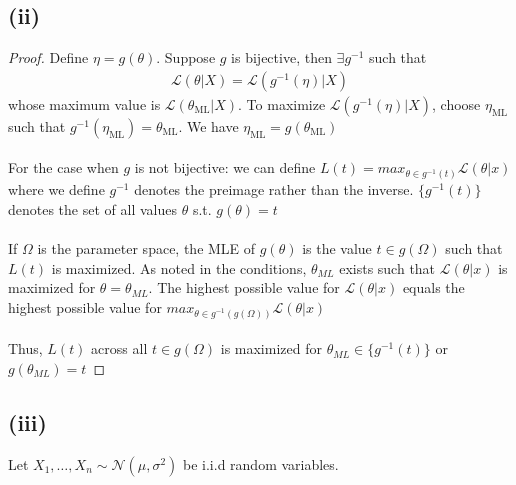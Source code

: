 \documentclass[twoside,11pt]{homework}
\begin{document}
\subsection*{(ii)}
	\begin{proof}
		Define $\eta = g(\theta)$. Suppose $g$ is bijective, then $\exists g^{-1}$ such that 
		\begin{align*}
			\mathcal{L}(\theta|X) = \mathcal{L}( g^{-1}(\eta) |X)
		\end{align*}
		whose maximum value is $\mathcal{L}(\theta_{\text{ML}}|X) $. 
		To maximize $\mathcal{L}( g^{-1}(\eta) |X)$, choose $\eta_{\text{ML}}$
		such that $g^{-1}(\eta_{\text{ML}})=\theta_{\text{ML}}$. We have $\eta_{\text{ML}}=g(\theta_{\text{ML}})$ \\ \\
		For the case when $g$ is not bijective: we can define $L(t) = max_{\theta \in g^{-1}(t)} \mathcal{L}(\theta | x)$ where we define
		$g^{-1}$ denotes the preimage rather than the inverse. $\{g^{-1}(t)\}$ denotes the set of all values $\theta$ s.t. $g(\theta) =t$ \\ \\
		If $\Omega$ is the parameter space, the MLE of $g(\theta)$ is the value $t \in g(\Omega)$ such that $L(t)$ is maximized. As noted in the conditions, $\theta _{ML} $ exists such that $\mathcal{L}(\theta| x)$ is maximized for $\theta = \theta_{ML}$. The highest possible value for $\mathcal{L}(\theta | x)$ equals the highest possible value for $max_{\theta \in g^{-1}(g(\Omega))} \mathcal{L}(\theta | x)$\\ \\
Thus, $L(t)$ across all $t \in g(\Omega) $ is maximized for $\theta_{ML} \in \{g^{-1}(t)\}$ or $g(\theta_{ML}) = t$ 
	\end{proof}
\subsection*{(iii)}
	Let $X_1,\dots, X_n \sim \mathcal{N}(\mu, \sigma^2)$ be i.i.d random variables.
\end{document}
